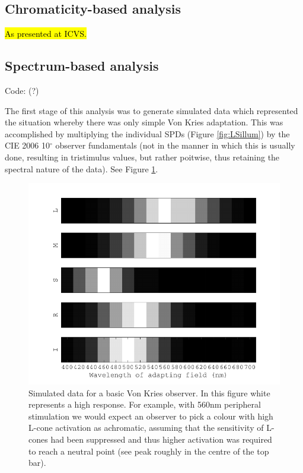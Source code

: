 \subsection{Chromaticity-based analysis}

\hl{As presented at ICVS.}

\subsection{Spectrum-based analysis}

Code: (?) %

The first stage of this analysis was to generate simulated data which represented the situation whereby there was only simple Von Kries adaptation. This was accomplished by multiplying the individual \glspl{SPD} (Figure \ref{fig:LSillum}) by the CIE 2006 10$^{\circ}$ observer fundamentals (not in the manner in which this is usually done, resulting in tristimulus values, but rather poitwise, thus retaining the spectral nature of the data). See Figure \ref{fig:LSsimdata}.

\begin{figure}[htbp]
\includegraphics[max width=\textwidth]{figs/LargeSphere/LSsimdata.pdf}
\caption{Simulated data for a basic Von Kries observer. In this figure white represents a high response. For example, with 560nm peripheral stimulation we would expect an observer to pick a colour with high L-cone activation as achromatic, assuming that the sensitivity of L-cones had been suppressed and thus higher activation was required to reach a neutral point (see peak roughly in the centre of the top bar).}
\label{fig:LSsimdata}
\end{figure}

